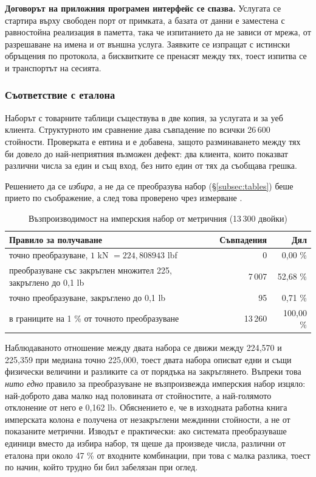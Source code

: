 \textbf{Договорът на приложния програмен интерфейс се спазва.} Услугата се стартира
върху свободен порт от примката, а базата от данни е заместена с равностойна реализация
в паметта, така че изпитанието да не зависи от мрежа, от разрешаване на имена и от
външна услуга. Заявките се изпращат с истински обръщения по протокола, а бисквитките се
пренасят между тях, тоест изпитва се и транспортът на сесията.

\subsubsection{Съответствие с еталона}
\label{subsec:oracle}

Наборът с товарните таблици съществува в две копия, за услугата и за уеб клиента.
Структурното им сравнение дава съвпадение по всички 26\,600 стойности. Проверката е
евтина и е добавена, защото разминаването между тях би довело до най-неприятния възможен
дефект: два клиента, които показват различни числа за един и същ вход, без нито един от
тях да съобщава грешка.

Решението да се \emph{избира}, а не да се преобразува набор (§\ref{subsec:tables}) беше
прието по съображение, а след това проверено чрез измерване .

\begin{table}[htbp]
\centering
\caption{Възпроизводимост на имперския набор от метричния (13\,300 двойки)}
\label{tab:units}
{\fontsize{10}{12}\selectfont
\begin{tabular}{@{}L{8.4cm}rr@{}}
\toprule
\textbf{Правило за получаване} & \textbf{Съвпадения} & \textbf{Дял} \\
\midrule
точно преобразуване, $1$ kN $= 224{,}808943$ lbf & 0 & 0{,}00 \% \\
преобразуване със закръглен множител 225, закръглено до 0{,}1 lb & 7\,007 & 52{,}68 \% \\
точно преобразуване, закръглено до 0{,}1 lb & 95 & 0{,}71 \% \\
\addlinespace
в границите на 1 \% от точното преобразуване & 13\,260 & 100{,}00 \% \\
\bottomrule
\end{tabular}}
\end{table}

Наблюдаваното отношение между двата набора се движи между 224{,}570 и 225{,}359 при
медиана точно 225{,}000, тоест двата набора описват едни и същи физически величини и
разликите са от порядъка на закръглянето. Въпреки това \emph{нито едно} правило за
преобразуване не възпроизвежда имперския набор изцяло: най-доброто дава малко над
половината от стойностите, а най-голямото отклонение от него е 0{,}162 lb. Обяснението
е, че в изходната работна книга имперската колона е получена от незакръглени междинни
стойности, а не от показаните метрични. Изводът е практически: ако системата
преобразуваше единици вместо да избира набор, тя щеше да произведе числа, различни от
еталона при около 47 \% от входните комбинации, при това с малка разлика, тоест по
начин, който трудно би бил забелязан при оглед.

